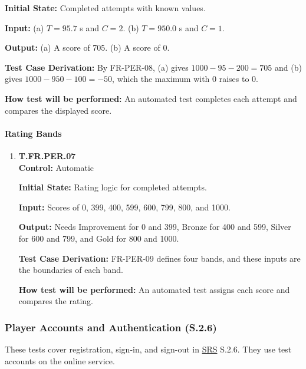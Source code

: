 \documentclass[12pt, titlepage]{article}
\begin{document}
{\begin{enumerate}
\textbf{Initial State:} Completed attempts with known values.

\textbf{Input:} (a) \(T = 95.7\) s and \(C = 2\). (b) \(T = 950.0\) s and \(C = 1\).

\textbf{Output:} (a) A score of 705. (b) A score of 0.

\textbf{Test Case Derivation:} By \mbox{FR-PER-08}, (a) gives \(1000 - 95 - 200 = 705\)
and (b) gives \(1000 - 950 - 100 = -50\), which the maximum with 0 raises to 0.

\textbf{How test will be performed:} An automated test completes each attempt and
compares the displayed score.

\end{enumerate}

\paragraph{Rating Bands}

\begin{enumerate}

\item{\hypertarget{test-fr-per-07}{}\textbf{T.FR.PER.07}\\}
\textbf{Control:} Automatic

\textbf{Initial State:} Rating logic for completed attempts.

\textbf{Input:} Scores of 0, 399, 400, 599, 600, 799, 800, and 1000.

\textbf{Output:} Needs Improvement for 0 and 399, Bronze for 400 and 599, Silver for 600
and 799, and Gold for 800 and 1000.

\textbf{Test Case Derivation:} \mbox{FR-PER-09} defines four bands, and these inputs are
the boundaries of each band.

\textbf{How test will be performed:} An automated test assigns each score and compares
the rating.

\end{enumerate}
\par}

\subsubsection{Player Accounts and Authentication (S.2.6)}

These tests cover registration, sign-in, and sign-out in \hyperlink{abbr:SRS}{SRS} S.2.6. They use test
accounts on the online service.
\end{document}
